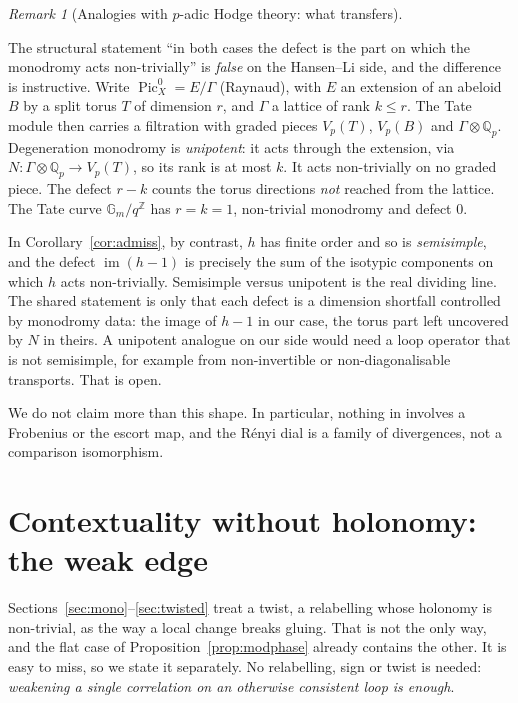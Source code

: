\documentclass[11pt]{article}
\theoremstyle{definition}
\theoremstyle{remark}
\newtheorem{remark}[theorem]{Remark}
\newcommand{\Z}{\mathbb{Z}}
\newcommand{\Q}{\mathbb{Q}}
\begin{document}
\begin{remark}[Analogies with $p$-adic Hodge theory: what transfers]
\begin{itemize}
The structural statement ``in both cases the defect is the part on which the monodromy acts non-trivially'' is \emph{false} on the Hansen--Li side, and the difference is instructive. Write $\operatorname{Pic}^0_X=E/\Gamma$ (Raynaud), with $E$ an extension of an abeloid $B$ by a split torus $T$ of dimension $r$, and $\Gamma$ a lattice of rank $k\le r$. The Tate module then carries a filtration with graded pieces $V_p(T)$, $V_p(B)$ and $\Gamma\otimes\Q_p$. Degeneration monodromy is \emph{unipotent}: it acts through the extension, via $N\colon\Gamma\otimes\Q_p\to V_p(T)$, so its rank is at most $k$. It acts non-trivially on no graded piece. The defect $r-k$ counts the torus directions \emph{not} reached from the lattice. The Tate curve $\mathbb G_m/q^{\Z}$ has $r=k=1$, non-trivial monodromy and defect $0$.

In Corollary~\ref{cor:admiss}, by contrast, $h$ has finite order and so is \emph{semisimple}, and the defect $\operatorname{im}(h-1)$ is precisely the sum of the isotypic components on which $h$ acts non-trivially. Semisimple versus unipotent is the real dividing line. The shared statement is only that each defect is a dimension shortfall controlled by monodromy data: the image of $h-1$ in our case, the torus part left uncovered by $N$ in theirs. A unipotent analogue on our side would need a loop operator that is not semisimple, for example from non-invertible or non-diagonalisable transports. That is open.

We do not claim more than this shape. In particular, nothing in \cite{hansenli} involves a Frobenius or the escort map, and the R\'enyi dial is a family of divergences, not a comparison isomorphism.
\end{itemize}
\end{remark}

\section{Contextuality without holonomy: the weak edge}\label{sec:weakedge}
Sections~\ref{sec:mono}--\ref{sec:twisted} treat a twist, a relabelling whose holonomy is non-trivial, as the way a local change breaks gluing. That is not the only way, and the flat case of Proposition~\ref{prop:modphase} already contains the other. It is easy to miss, so we state it separately. No relabelling, sign or twist is needed: \emph{weakening a single correlation on an otherwise consistent loop is enough}.
\end{document}
